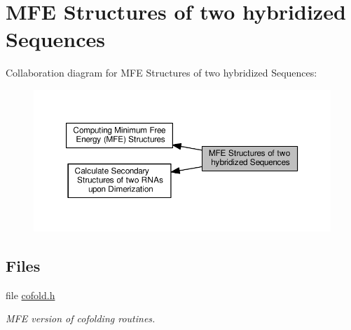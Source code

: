\hypertarget{group__mfe__cofold}{}\section{M\+FE Structures of two hybridized Sequences}
\label{group__mfe__cofold}
Collaboration diagram for M\+FE Structures of two hybridized Sequences\+:
\nopagebreak
\begin{figure}[H]
\begin{center}
\leavevmode
\includegraphics[width=350pt]{group__mfe__cofold}
\end{center}
\end{figure}
\subsection*{Files}
\begin{DoxyCompactItemize}
\item 
file \hyperlink{cofold_8h}{cofold.\+h}
\begin{DoxyCompactList}\small\item\em M\+FE version of cofolding routines. \end{DoxyCompactList}\end{DoxyCompactItemize}
